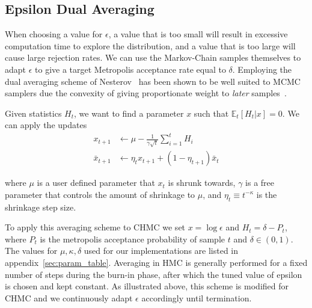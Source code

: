 \documentclass[11pt]{article}
\begin{document}
    \subsection{Epsilon Dual Averaging}
    When choosing a value for $\epsilon$, a value that is too small will result in excessive computation time to explore
    the distribution, and a value that is too large will cause large rejection rates.
    We can use the Markov-Chain samples themselves to adapt $\epsilon$ to give a target Metropolis acceptance rate equal to $\delta$.
    Employing the dual averaging scheme of Nesterov~\cite{nesterov_dual_averaging} has been shown to be well suited
    to MCMC samplers due the convexity of giving proportionate weight to \emph{later} samples~\cite{hoffman2011nouturn}.

    Given statistics $H_t$, we want to find a parameter $x$ such that $\mathbb{E}_t[H_t|x] = 0$.
    We can apply the updates
    \begin{equation}\label{eq:dual_averaging}
    \begin{aligned}
        x_{t+1} &\gets \mu - \frac{1}{\gamma \sqrt{t}} \sum_{i=1}^t H_i \\
        \bar{x}_{t+1} &\gets \eta_t x_{t+1} + (1 - \eta_{t+1}) \bar{x}_t
    \end{aligned}
    \end{equation}

    where $\mu$ is a user defined parameter that $x_t$ is shrunk towards, $\gamma$ is a free parameter that controls
    the amount of shrinkage to $\mu$, and $\eta_t \equiv t^{-\kappa}$ is the shrinkage step size.

    To apply this averaging scheme to CHMC we set $x = \log{\epsilon}$ and $H_t = \delta - P_t$, where $P_t$ is the
    metropolis acceptance probability of sample $t$ and $\delta \in (0, 1)$.
    The values for $\mu, \kappa, \delta$ used for our implementations are listed in appendix~\ref{sec:param_table}.
    Averaging in HMC is generally performed for a fixed number of steps during the burn-in phase, after which the
    tuned value of epsilon is chosen and kept constant.
    As illustrated above, this scheme is modified for CHMC and we continuously adapt $\epsilon$ accordingly until termination.
\end{document}
